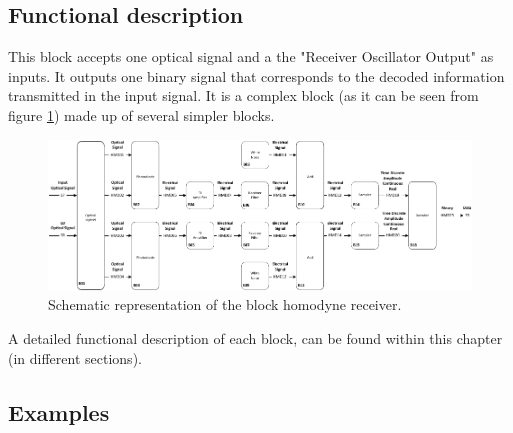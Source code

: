 \subsection*{Functional description}

This block accepts one optical signal and a the "Receiver Oscillator Output" as inputs. It outputs one binary signal that corresponds to the decoded information transmitted in the input signal. It is a complex
block (as it can be seen from figure \ref{fig:homodyneRx_blocks}) made up of
several simpler blocks.

\begin{figure}[H]
	\centering
	\includegraphics[width=\textwidth]{../lib/m_qam_receiver/figures/homodyneRx_blocks.pdf}
	\caption{Schematic representation of the block homodyne
	receiver.}\label{fig:homodyneRx_blocks}
\end{figure}
A detailed functional description of each block, can be found within this chapter (in different sections).
\subsection*{Examples}

